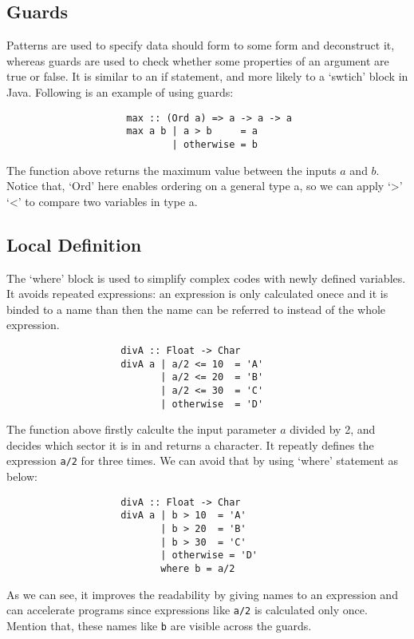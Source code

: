 \subsection{Guards}

Patterns are used to specify data should form to some form and deconstruct it, whereas guards are used to check whether some properties of an argument are true or false. It is similar to an if statement, and more likely to a `swtich' block in Java. Following is an example of using guards:
\begin{verbatim}
                     max :: (Ord a) => a -> a -> a
                     max a b | a > b     = a
                             | otherwise = b
\end{verbatim}
The function above returns the maximum value between the inputs $a$ and $b$. Notice that, `Ord' here enables ordering on a general type a, so we can apply `>' `<' to compare two variables in type a.

\subsection{Local Definition}

The `where' block is used to simplify complex codes with newly defined variables. It avoids repeated expressions: an expression is only calculated onece and it is binded to a name than then the name can be referred to instead of the whole expression. 

\begin{verbatim}
                    divA :: Float -> Char
                    divA a | a/2 <= 10  = 'A' 
                           | a/2 <= 20  = 'B'
                           | a/2 <= 30  = 'C'
                           | otherwise  = 'D'
\end{verbatim}

The function above firstly calculte the input parameter $a$ divided by 2, and decides which sector it is in and returns a character. It repeatly defines the expression \verb|a/2| for three times. We can avoid that by using `where' statement as below: 
\begin{verbatim}
                    divA :: Float -> Char
                    divA a | b > 10  = 'A' 
                           | b > 20  = 'B'
                           | b > 30  = 'C'
                           | otherwise = 'D'
                           where b = a/2
\end{verbatim}

As we can see, it improves the readability by giving names to an expression and can accelerate programs since expressions like \verb|a/2| is calculated only once. Mention that, these names like \verb|b| are visible across the guards. 

